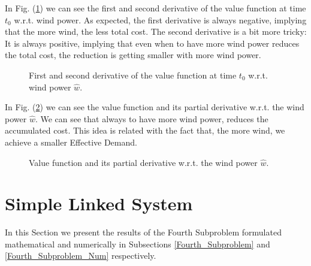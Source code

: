 In Fig. (\ref{Plot_SP3_4}) we can see the first and second derivative of the value function at time $t_0$ w.r.t. wind power. As expected, the first derivative is always negative, implying that the more wind, the less total cost. The second derivative is a bit more tricky: It is always positive, implying that even when to have more wind power reduces the total cost, the reduction is getting smaller with more wind power.

\begin{figure}[H]
\centering
{}\qquad
{}
\caption{First and second derivative of the value function at time $t_0$ w.r.t. wind power $\hat{w}$.}
\label{Plot_SP3_4}
\end{figure}

In Fig. (\ref{Plot_SP3_5}) we can see the value function and its partial derivative w.r.t. the wind power $\hat{w}$. We can see that always to have more wind power, reduces the accumulated cost. This idea is related with the fact that, the more wind, we achieve a smaller Effective Demand.

\begin{figure}[H]
\centering
{}\quad
{}
\caption{Value function and its partial derivative w.r.t. the wind power $\hat{w}$.}
\label{Plot_SP3_5}
\end{figure}

\section{Simple Linked System} \label{Fourth_Subproblem_Results}

In this Section we present the results of the Fourth Subproblem formulated mathematical and numerically in Subsections \ref{Fourth_Subproblem} and \ref{Fourth_Subproblem_Num} respectively.\\

